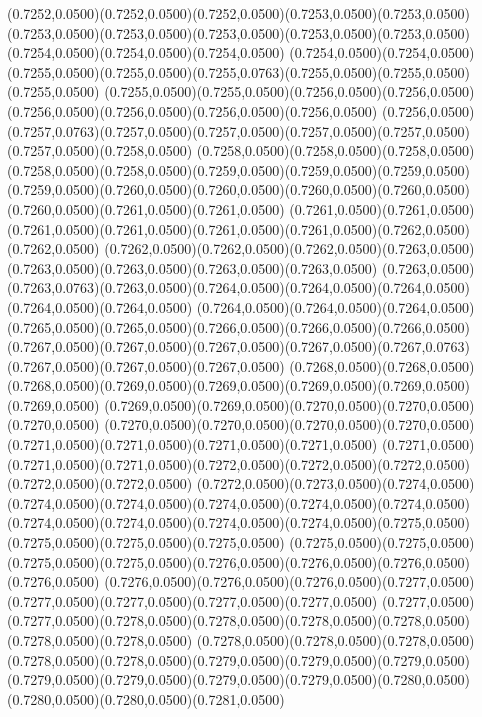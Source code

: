(0.7252,0.0500)(0.7252,0.0500)(0.7252,0.0500)(0.7253,0.0500)(0.7253,0.0500)
\PST@Solid(0.7253,0.0500)(0.7253,0.0500)(0.7253,0.0500)(0.7253,0.0500)(0.7253,0.0500)(0.7254,0.0500)(0.7254,0.0500)(0.7254,0.0500)
(0.7254,0.0500)(0.7254,0.0500)(0.7255,0.0500)(0.7255,0.0500)(0.7255,0.0763)(0.7255,0.0500)(0.7255,0.0500)(0.7255,0.0500)
(0.7255,0.0500)(0.7255,0.0500)(0.7256,0.0500)(0.7256,0.0500)(0.7256,0.0500)(0.7256,0.0500)(0.7256,0.0500)(0.7256,0.0500)
(0.7256,0.0500)(0.7257,0.0763)(0.7257,0.0500)(0.7257,0.0500)(0.7257,0.0500)(0.7257,0.0500)(0.7257,0.0500)(0.7258,0.0500)
(0.7258,0.0500)(0.7258,0.0500)(0.7258,0.0500)(0.7258,0.0500)(0.7258,0.0500)(0.7259,0.0500)(0.7259,0.0500)(0.7259,0.0500)
(0.7259,0.0500)(0.7260,0.0500)(0.7260,0.0500)(0.7260,0.0500)(0.7260,0.0500)(0.7260,0.0500)(0.7261,0.0500)(0.7261,0.0500)
(0.7261,0.0500)(0.7261,0.0500)(0.7261,0.0500)(0.7261,0.0500)(0.7261,0.0500)(0.7261,0.0500)(0.7262,0.0500)(0.7262,0.0500)
(0.7262,0.0500)(0.7262,0.0500)(0.7262,0.0500)(0.7263,0.0500)(0.7263,0.0500)(0.7263,0.0500)(0.7263,0.0500)(0.7263,0.0500)
(0.7263,0.0500)(0.7263,0.0763)(0.7263,0.0500)(0.7264,0.0500)(0.7264,0.0500)(0.7264,0.0500)(0.7264,0.0500)(0.7264,0.0500)
(0.7264,0.0500)(0.7264,0.0500)(0.7264,0.0500)(0.7265,0.0500)(0.7265,0.0500)(0.7266,0.0500)(0.7266,0.0500)(0.7266,0.0500)
(0.7267,0.0500)(0.7267,0.0500)(0.7267,0.0500)(0.7267,0.0500)(0.7267,0.0763)(0.7267,0.0500)(0.7267,0.0500)(0.7267,0.0500)
(0.7268,0.0500)(0.7268,0.0500)(0.7268,0.0500)(0.7269,0.0500)(0.7269,0.0500)(0.7269,0.0500)(0.7269,0.0500)(0.7269,0.0500)
(0.7269,0.0500)(0.7269,0.0500)(0.7270,0.0500)(0.7270,0.0500)(0.7270,0.0500)
\PST@Solid(0.7270,0.0500)(0.7270,0.0500)(0.7270,0.0500)(0.7270,0.0500)(0.7271,0.0500)(0.7271,0.0500)(0.7271,0.0500)(0.7271,0.0500)
(0.7271,0.0500)(0.7271,0.0500)(0.7271,0.0500)(0.7272,0.0500)(0.7272,0.0500)(0.7272,0.0500)(0.7272,0.0500)(0.7272,0.0500)
(0.7272,0.0500)(0.7273,0.0500)(0.7274,0.0500)(0.7274,0.0500)(0.7274,0.0500)(0.7274,0.0500)(0.7274,0.0500)(0.7274,0.0500)
(0.7274,0.0500)(0.7274,0.0500)(0.7274,0.0500)(0.7274,0.0500)(0.7275,0.0500)(0.7275,0.0500)(0.7275,0.0500)(0.7275,0.0500)
(0.7275,0.0500)(0.7275,0.0500)(0.7275,0.0500)(0.7275,0.0500)(0.7276,0.0500)(0.7276,0.0500)(0.7276,0.0500)(0.7276,0.0500)
(0.7276,0.0500)(0.7276,0.0500)(0.7276,0.0500)(0.7277,0.0500)(0.7277,0.0500)(0.7277,0.0500)(0.7277,0.0500)(0.7277,0.0500)
(0.7277,0.0500)(0.7277,0.0500)(0.7278,0.0500)(0.7278,0.0500)(0.7278,0.0500)(0.7278,0.0500)(0.7278,0.0500)(0.7278,0.0500)
(0.7278,0.0500)(0.7278,0.0500)(0.7278,0.0500)(0.7278,0.0500)(0.7278,0.0500)(0.7279,0.0500)(0.7279,0.0500)(0.7279,0.0500)
(0.7279,0.0500)(0.7279,0.0500)(0.7279,0.0500)(0.7279,0.0500)(0.7280,0.0500)(0.7280,0.0500)(0.7280,0.0500)(0.7281,0.0500)

